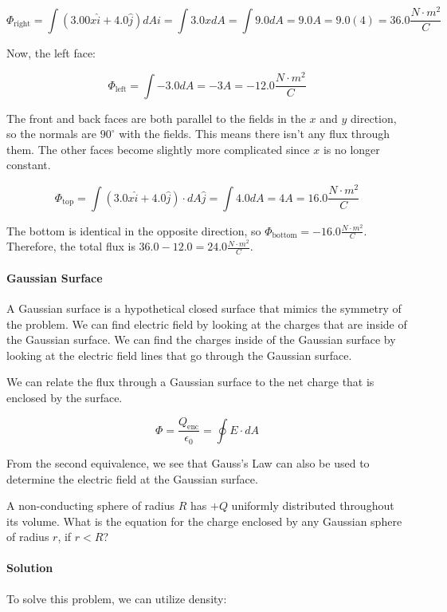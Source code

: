 \documentclass{scrartcl}
\theoremstyle{definition}
\begin{document}
	$$
	\Phi_\text{right} = \int (3.00 x \hat{i} + 4.0 \hat{j} )dAi = \int 3.0 xdA = \int 9.0 dA = 9.0A = 9.0(4) = 36.0 \frac{N \cdot m^2}{C}
	$$
	
	\noindent Now, the left face:
	
	$$
	\Phi_\text{left} = \int - 3.0 dA = -3A = -12.0 \frac{N \cdot m^2}{C}
	$$
	
	\noindent The front and back faces are both parallel to the fields in the $x$ and $y$ direction, so the normals are $90^\circ$ with the fields. This means there isn't any flux through them. The other faces become slightly more complicated since $x$ is no longer constant. 
	
	$$
	\Phi_\text{top} = \int (3.0 x \hat{i} + 4.0 \hat{j}) \cdot dA \hat{j} = \int 4.0 dA = 4A = 16.0 \frac{N \cdot m^2}{C}
	$$
	
	\noindent The bottom is identical in the opposite direction, so $\Phi_\text{bottom} = -16.0 \frac{N \cdot m^2}{C}$. Therefore, the total flux is $36.0 - 12.0 = 24.0 \frac{N \cdot m^2}{C}$.
	
	\paragraph{Gaussian Surface} A Gaussian surface is a hypothetical closed surface that mimics the symmetry of the problem. We can find electric field by looking at the charges that are inside of the Gaussian surface. We can find the charges inside of the Gaussian surface by looking at the electric field lines that go through the Gaussian surface.
	
	\begin{theorem}
		We can relate the flux through a Gaussian surface to the net charge that is enclosed by the surface.
		
		$$
		\Phi = \frac{Q_\text{enc}}{\epsilon_0} = \oint E \cdot dA
		$$
		
		\noindent From the second equivalence, we see that Gauss's Law can also be used to determine the electric field at the Gaussian surface.
	\end{theorem}
	
	\begin{example}
		A non-conducting sphere of radius $R$ has $+Q$ uniformly distributed throughout its volume. What is the equation for the charge enclosed by any Gaussian sphere of radius $r$, if $r < R$?
	\end{example}
	
	\paragraph{Solution} To solve this problem, we can utilize density:
	
\end{document}
